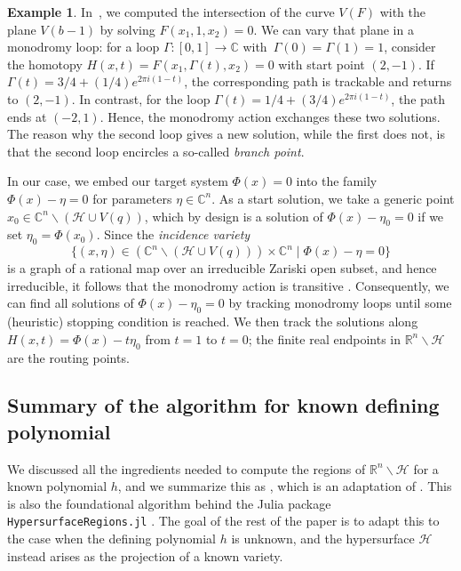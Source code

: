 \documentclass[11pt]{article}
\numberwithin{equation}{section}
\theoremstyle{plain}
\theoremstyle{definition}
\newtheorem{example}[theorem]{Example}
\theoremstyle{remark}
\newcommand{\sH}{{\mathcal H}}
\newcommand\bC{{\mathbb C}}
\newcommand\bR{{\mathbb R}}
\begin{document}
\begin{example}\label{ex:QuadDiscMonodromy}
In~, we computed the intersection of the curve $V(F)$ with the plane $V(b-1)$ by solving $F(x_1,1,x_2)=0$. We can vary that plane in a monodromy loop:
for a loop $\Gamma\colon [0,1] \to \bC$ with~$\Gamma(0)=\Gamma(1)=1$, consider the homotopy
$
        H(x,t) = F(x_{1},\Gamma(t),x_{2}) = 0
$
    with start point $(2,-1)$. If $\Gamma(t) = 3/4 + (1/4)e^{2\pi i(1-t)}$, the corresponding path is trackable and returns to $(2,-1)$. In contrast, for the loop $\Gamma(t) = 1/4 + (3/4)e^{2\pi i(1-t)}$, the path ends at $(-2,1)$. Hence, the monodromy action exchanges these two solutions. The reason why the second loop gives a new solution, while the first does not, is that the second loop encircles a so-called \emph{branch point}.
\end{example} 


In our case, we embed our target system $\Phi(x) = 0$ into the family $\Phi(x) -\eta = 0$ for parameters $\eta\in\bC^n$. As a start solution, we take a generic point $x_0\in\bC^n\smallsetminus (\sH \cup V(q))$, which by design is a solution of $\Phi(x) - \eta_{0}=0$ if we set $\eta_{0} = \Phi(x_{0})$. Since the \emph{incidence variety} 
\begin{equation*}
\{(x,\eta)\in (\bC^{n}\smallsetminus(\sH \cup V(q)))\times \bC^{n} \mid \Phi(x)-\eta=0\}
\end{equation*}
is a graph of a rational map over an irreducible Zariski open subset, and hence irreducible, it follows that the monodromy action is transitive \cite{Duff2018monodromy}. Consequently, we can find all solutions of $\Phi(x) - \eta_{0}=0$ by tracking monodromy loops until some (heuristic) stopping condition is reached. We then track the solutions along $H(x,t) = \Phi(x) - t\eta_0$  from $t=1$ to $t=0$; the finite real endpoints in $\bR^{n}\smallsetminus \sH$ are the routing points.

\subsection{Summary of the algorithm for known defining polynomial}
\label{subsec:summary_known_h}

We discussed all the ingredients needed to compute the regions of $\bR^{n}\smallsetminus \sH$ for a known polynomial $h$, and we summarize this as , which is an adaptation of  \cite[Algorithm~1]{SmoothConnectivity}. This is also the foundational algorithm behind the Julia package \texttt{HypersurfaceRegions.jl} \cite{HypersurfaceRegions}. 
The goal of the rest of the paper is to adapt this to the case when the defining polynomial $h$ is unknown, and the hypersurface $\mathcal{H}$ instead arises as the projection of a known variety.
\end{document}
